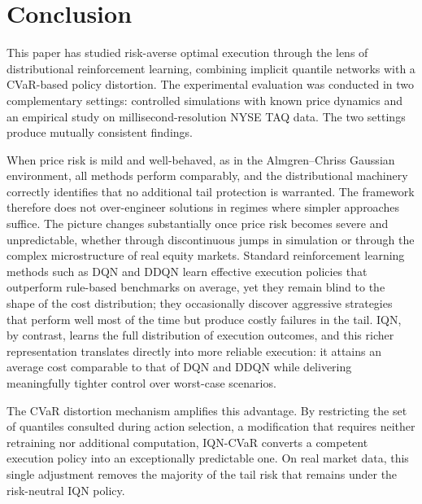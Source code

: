 \documentclass[11pt]{article}
\begin{document}

\section{Conclusion}\label{sec:conclusion}

This paper has studied risk-averse optimal execution through the lens of
distributional reinforcement learning, combining implicit quantile networks
with a CVaR-based policy distortion. The experimental evaluation was
conducted in two complementary settings: controlled simulations with known
price dynamics and an empirical study on millisecond-resolution NYSE TAQ
data. The two settings produce mutually consistent findings.

When price risk is mild and well-behaved, as in the Almgren--Chriss Gaussian
environment, all methods perform comparably, and the distributional
machinery correctly identifies that no additional tail protection is
warranted. The framework therefore does not over-engineer solutions in
regimes where simpler approaches suffice. The picture changes substantially
once price risk becomes severe and unpredictable, whether through
discontinuous jumps in simulation or through the complex microstructure of
real equity markets. Standard reinforcement learning methods such as DQN
and DDQN learn effective execution policies that outperform rule-based
benchmarks on average, yet they remain blind to the shape of the cost
distribution; they occasionally discover aggressive strategies that perform
well most of the time but produce costly failures in the tail. IQN, by
contrast, learns the full distribution of execution outcomes, and this
richer representation translates directly into more reliable execution: it
attains an average cost comparable to that of DQN and DDQN while delivering
meaningfully tighter control over worst-case scenarios.

The CVaR distortion mechanism amplifies this advantage. By restricting the
set of quantiles consulted during action selection, a modification that
requires neither retraining nor additional computation, IQN-CVaR converts a
competent execution policy into an exceptionally predictable one. On real
market data, this single adjustment removes the majority of the tail risk
that remains under the risk-neutral IQN policy.
\end{document}
